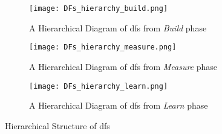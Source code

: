 \begin{figure}[htbp!]
    \centering
    \begin{subfigure}[b]{1.0\textwidth}
    \centering
    \texttt{[image: DFs\_hierarchy\_build.png]}
    \caption{A Hierarchical Diagram of \ac{df}s from \textit{Build} phase}
    \label{fig:implementation:hierarchy:build}
    \end{subfigure}
    \begin{subfigure}[b]{1.0\textwidth}
    \centering
    \texttt{[image: DFs\_hierarchy\_measure.png]}
    \caption{A Hierarchical Diagram of \ac{df}s from \textit{Measure} phase}
    \label{fig:implementation:hierarchy:measure} 
    \end{subfigure}             
    \begin{subfigure}[b]{1.0\textwidth}
    \centering
    \texttt{[image: DFs\_hierarchy\_learn.png]}
    \caption{A Hierarchical Diagram of \ac{df}s from \textit{Learn} phase}
    \label{fig:implementation:hierarchy:learn}
    \end{subfigure}
    \caption[A Map Between DPs and DFs]{Hierarchical Structure of \ac{df}s}
    \label{fig:implementation:hierarchy}
\end{figure}

